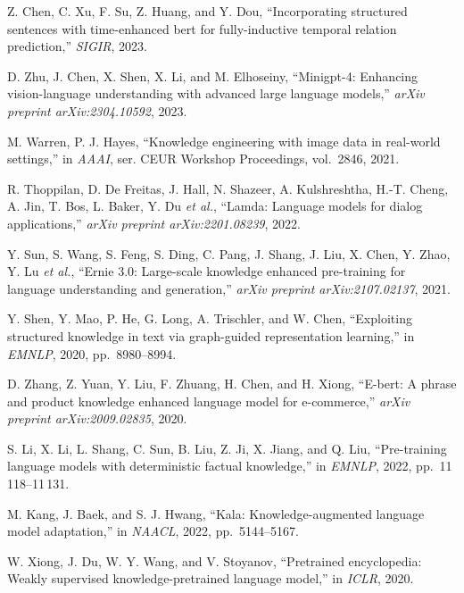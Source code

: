 \begin{enumerate}[leftmargin=2em,label={[\arabic*]}]
\item Z. Chen, C. Xu, F. Su, Z. Huang, and Y. Dou, ``Incorporating structured sentences with time-enhanced bert for fully-inductive temporal relation prediction,'' \textit{SIGIR}, 2023.

\item D. Zhu, J. Chen, X. Shen, X. Li, and M. Elhoseiny, ``Minigpt-4: Enhancing vision-language understanding with advanced large language models,'' \textit{arXiv preprint arXiv:2304.10592}, 2023.

\item M. Warren, P. J. Hayes, ``Knowledge engineering with image data in real-world settings,'' in \textit{AAAI}, ser. CEUR Workshop Proceedings, vol.~2846, 2021.

\item R. Thoppilan, D. De Freitas, J. Hall, N. Shazeer, A. Kulshreshtha, H.-T. Cheng, A. Jin, T. Bos, L. Baker, Y. Du \textit{et al.}, ``Lamda: Language models for dialog applications,'' \textit{arXiv preprint arXiv:2201.08239}, 2022.

\item Y. Sun, S. Wang, S. Feng, S. Ding, C. Pang, J. Shang, J. Liu, X. Chen, Y. Zhao, Y. Lu \textit{et al.}, ``Ernie 3.0: Large-scale knowledge enhanced pre-training for language understanding and generation,'' \textit{arXiv preprint arXiv:2107.02137}, 2021.

\item Y. Shen, Y. Mao, P. He, G. Long, A. Trischler, and W. Chen, ``Exploiting structured knowledge in text via graph-guided representation learning,'' in \textit{EMNLP}, 2020, pp.~8980--8994.

\item D. Zhang, Z. Yuan, Y. Liu, F. Zhuang, H. Chen, and H. Xiong, ``E-bert: A phrase and product knowledge enhanced language model for e-commerce,'' \textit{arXiv preprint arXiv:2009.02835}, 2020.

\item S. Li, X. Li, L. Shang, C. Sun, B. Liu, Z. Ji, X. Jiang, and Q. Liu, ``Pre-training language models with deterministic factual knowledge,'' in \textit{EMNLP}, 2022, pp.~11\,118--11\,131.

\item M. Kang, J. Baek, and S. J. Hwang, ``Kala: Knowledge-augmented language model adaptation,'' in \textit{NAACL}, 2022, pp.~5144--5167.

\item W. Xiong, J. Du, W. Y. Wang, and V. Stoyanov, ``Pretrained encyclopedia: Weakly supervised knowledge-pretrained language model,'' in \textit{ICLR}, 2020.


\end{enumerate}
